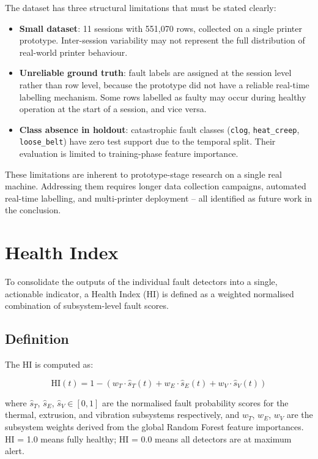 The dataset has three structural limitations that must be stated clearly:
\begin{itemize}
    \item \textbf{Small dataset}: 11 sessions with 551,070 rows, collected on a single
          printer prototype. Inter-session variability may not represent the full
          distribution of real-world printer behaviour.
    \item \textbf{Unreliable ground truth}: fault labels are assigned at the session level
          rather than row level, because the prototype did not have a reliable real-time
          labelling mechanism. Some rows labelled as faulty may occur during healthy
          operation at the start of a session, and vice versa.
    \item \textbf{Class absence in holdout}: catastrophic fault classes (\texttt{clog},
          \texttt{heat\_creep}, \texttt{loose\_belt}) have zero test support due to the
          temporal split. Their evaluation is limited to training-phase feature importance.
\end{itemize}
These limitations are inherent to prototype-stage research on a single real machine.
Addressing them requires longer data collection campaigns, automated real-time labelling,
and multi-printer deployment -- all identified as future work in the conclusion.

\section{Health Index}
\label{sec:health_index}

To consolidate the outputs of the individual fault detectors into a single, actionable
indicator, a Health Index (HI) is defined as a weighted normalised combination
of subsystem-level fault scores.

\subsection{Definition}

The HI is computed as:

\begin{equation}
    \text{HI}(t) = 1 - \left( w_T \cdot \hat{s}_T(t) + w_E \cdot \hat{s}_E(t) + w_V \cdot \hat{s}_V(t) \right)
    \label{eq:health_index}
\end{equation}

where $\hat{s}_T$, $\hat{s}_E$, $\hat{s}_V \in [0,1]$ are the normalised fault
probability scores for the thermal, extrusion, and vibration subsystems respectively,
and $w_T$, $w_E$, $w_V$ are the subsystem weights derived from the global Random Forest
feature importances. HI = 1.0 means fully healthy; HI = 0.0 means all detectors are at
maximum alert.


